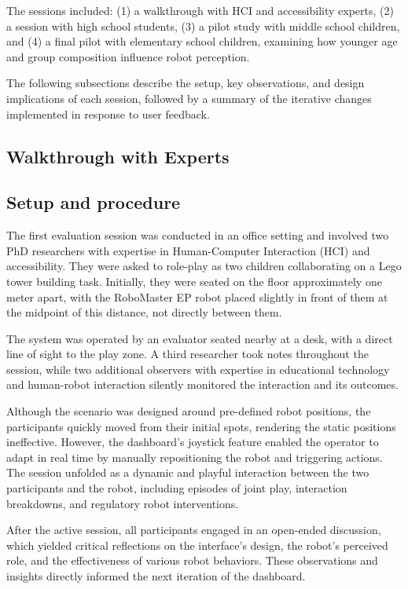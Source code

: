 \documentclass[a4paper]{usiinfbachelorproject}
\begin{document}
The sessions included:
(1) a walkthrough with HCI and accessibility experts,
(2) a session with high school students,
(3) a pilot study with middle school children, and
(4) a final pilot with elementary school children, examining how younger age and group composition influence robot perception.

The following subsections describe the setup, key observations, and design implications of each session, followed by a summary of the iterative changes implemented in response to user feedback.


\subsection{\textbf{Walkthrough with Experts}}\label{sec:expert-walkthrough}
\subsection*{\textbf{Setup and procedure}}
The first evaluation session was conducted in an office setting and involved two PhD researchers with expertise in Human-Computer Interaction (HCI) and accessibility.
They were asked to role-play as two children collaborating on a Lego tower building task.
Initially, they were seated on the floor approximately one meter apart, with the RoboMaster EP robot placed slightly in front of them at the midpoint of this distance, not directly between them.

The system was operated by an evaluator seated nearby at a desk, with a direct line of sight to the play zone.
A third researcher took notes throughout the session, while two additional observers with expertise in educational technology and human-robot interaction silently monitored the interaction and its outcomes.

Although the scenario was designed around pre-defined robot positions, the participants quickly moved from their initial spots, rendering the static positions ineffective.
However, the dashboard's joystick feature enabled the operator to adapt in real time by manually repositioning the robot and triggering actions.
The session unfolded as a dynamic and playful interaction between the two participants and the robot, including episodes of joint play, interaction breakdowns, and regulatory robot interventions.

After the active session, all participants engaged in an open-ended discussion, which yielded critical reflections on the interface's design, the robot's perceived role, and the effectiveness of various robot behaviors.
These observations and insights directly informed the next iteration of the dashboard.
\end{document}
